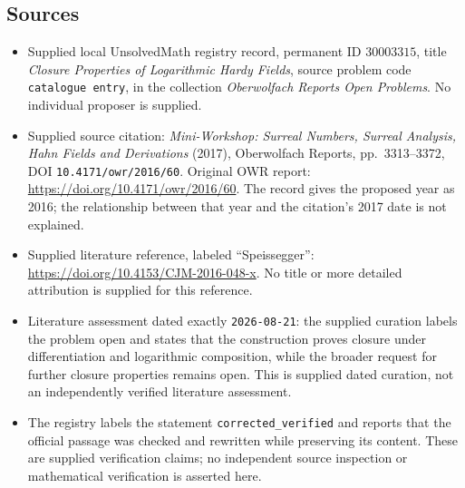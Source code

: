 \documentclass[11pt]{article}
\begin{document}
\subsection{Sources}
\begin{itemize}
\item Supplied local UnsolvedMath registry record, permanent ID \(30003315\), title \emph{Closure Properties of Logarithmic Hardy Fields}, source problem code \texttt{catalogue entry}, in the collection \emph{Oberwolfach Reports Open Problems}. No individual proposer is supplied.
\item Supplied source citation: \emph{Mini-Workshop: Surreal Numbers, Surreal Analysis, Hahn Fields and Derivations} (2017), Oberwolfach Reports, pp.\ 3313--3372, DOI \texttt{10.4171/owr/2016/60}. Original OWR report: \url{https://doi.org/10.4171/owr/2016/60}. The record gives the proposed year as 2016; the relationship between that year and the citation's 2017 date is not explained.
\item Supplied literature reference, labeled ``Speissegger'': \url{https://doi.org/10.4153/CJM-2016-048-x}. No title or more detailed attribution is supplied for this reference.
\item Literature assessment dated exactly \texttt{2026-08-21}: the supplied curation labels the problem open and states that the construction proves closure under differentiation and logarithmic composition, while the broader request for further closure properties remains open. This is supplied dated curation, not an independently verified literature assessment.
\item The registry labels the statement \texttt{corrected\_verified} and reports that the official passage was checked and rewritten while preserving its content. These are supplied verification claims; no independent source inspection or mathematical verification is asserted here.
\end{itemize}
\end{document}
